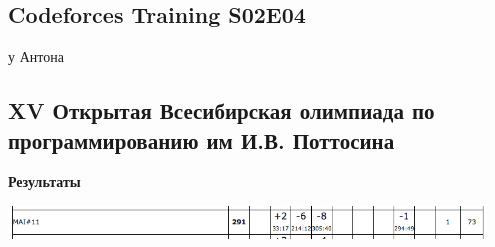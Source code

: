 \documentclass[a4paper,12pt]{article}
\begin{document}
%
%
\newpage
\subsection{Codeforces Training S02E04}

{\Huge у Антона}



%
%
\newpage
\subsection{XV Открытая Всесибирская олимпиада по программированию им И.В. Поттосина}

\textbf{{\large Результаты}} \\
\begin{center}
\includegraphics[width=0.95\textwidth]{Siberia/Siberia_result.png}\\ [1cm]
\end{center}
\end{document}
